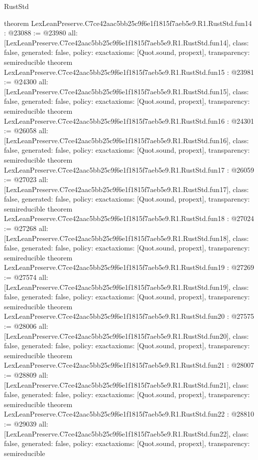 \begin{lexlean}{RustStd}
\begin{coremodule}
{}
theorem LexLeanPreserve.C7ce42aac5bb25c9f6e1f1815f7aeb5e9.R1.RustStd.fun14 : @23088 := @23980 {
  all: [LexLeanPreserve.C7ce42aac5bb25c9f6e1f1815f7aeb5e9.R1.RustStd.fun14],
  class: false,
  generated: false,
  policy: exact{axioms: [Quot.sound, propext]},
  transparency: semireducible
}
theorem LexLeanPreserve.C7ce42aac5bb25c9f6e1f1815f7aeb5e9.R1.RustStd.fun15 : @23981 := @24300 {
  all: [LexLeanPreserve.C7ce42aac5bb25c9f6e1f1815f7aeb5e9.R1.RustStd.fun15],
  class: false,
  generated: false,
  policy: exact{axioms: [Quot.sound, propext]},
  transparency: semireducible
}
theorem LexLeanPreserve.C7ce42aac5bb25c9f6e1f1815f7aeb5e9.R1.RustStd.fun16 : @24301 := @26058 {
  all: [LexLeanPreserve.C7ce42aac5bb25c9f6e1f1815f7aeb5e9.R1.RustStd.fun16],
  class: false,
  generated: false,
  policy: exact{axioms: [Quot.sound, propext]},
  transparency: semireducible
}
theorem LexLeanPreserve.C7ce42aac5bb25c9f6e1f1815f7aeb5e9.R1.RustStd.fun17 : @26059 := @27023 {
  all: [LexLeanPreserve.C7ce42aac5bb25c9f6e1f1815f7aeb5e9.R1.RustStd.fun17],
  class: false,
  generated: false,
  policy: exact{axioms: [Quot.sound, propext]},
  transparency: semireducible
}
theorem LexLeanPreserve.C7ce42aac5bb25c9f6e1f1815f7aeb5e9.R1.RustStd.fun18 : @27024 := @27268 {
  all: [LexLeanPreserve.C7ce42aac5bb25c9f6e1f1815f7aeb5e9.R1.RustStd.fun18],
  class: false,
  generated: false,
  policy: exact{axioms: [Quot.sound, propext]},
  transparency: semireducible
}
theorem LexLeanPreserve.C7ce42aac5bb25c9f6e1f1815f7aeb5e9.R1.RustStd.fun19 : @27269 := @27574 {
  all: [LexLeanPreserve.C7ce42aac5bb25c9f6e1f1815f7aeb5e9.R1.RustStd.fun19],
  class: false,
  generated: false,
  policy: exact{axioms: [Quot.sound, propext]},
  transparency: semireducible
}
theorem LexLeanPreserve.C7ce42aac5bb25c9f6e1f1815f7aeb5e9.R1.RustStd.fun20 : @27575 := @28006 {
  all: [LexLeanPreserve.C7ce42aac5bb25c9f6e1f1815f7aeb5e9.R1.RustStd.fun20],
  class: false,
  generated: false,
  policy: exact{axioms: [Quot.sound, propext]},
  transparency: semireducible
}
theorem LexLeanPreserve.C7ce42aac5bb25c9f6e1f1815f7aeb5e9.R1.RustStd.fun21 : @28007 := @28809 {
  all: [LexLeanPreserve.C7ce42aac5bb25c9f6e1f1815f7aeb5e9.R1.RustStd.fun21],
  class: false,
  generated: false,
  policy: exact{axioms: [Quot.sound, propext]},
  transparency: semireducible
}
theorem LexLeanPreserve.C7ce42aac5bb25c9f6e1f1815f7aeb5e9.R1.RustStd.fun22 : @28810 := @29039 {
  all: [LexLeanPreserve.C7ce42aac5bb25c9f6e1f1815f7aeb5e9.R1.RustStd.fun22],
  class: false,
  generated: false,
  policy: exact{axioms: [Quot.sound, propext]},
  transparency: semireducible
}
\end{coremodule}
\end{lexlean}
